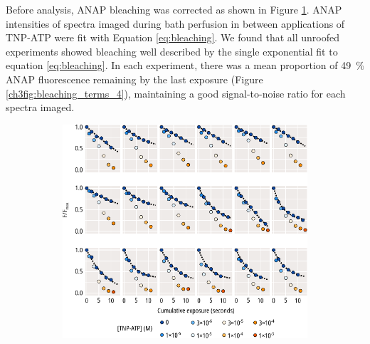 Before analysis, ANAP bleaching was corrected as shown in Figure \ref{ch3fig:bleaching_plots_2}.
ANAP intensities of spectra imaged during bath perfusion in between applications of TNP-ATP were fit with Equation \ref{eq:bleaching}.
We found that all unroofed experiments showed bleaching well described by the single exponential fit to equation \ref{eq:bleaching}.
In each experiment, there was a mean proportion of \SI{49}{\percent} ANAP fluorescence remaining by the last exposure (Figure \ref{ch3fig:bleaching_terms_4}), maintaining a good signal-to-noise ratio for each spectra imaged.

\begin{figure}[h]
	\centering
	\begin{subfigure}[t]{0.9\textwidth}
		\caption{}\label{ch3fig:bleaching_plots_2}
		\centering
		\includegraphics[width=\textwidth]{bleaching_plots_2.pdf}
	\end{subfigure}
	\vfill
	\begin{subfigure}[t]{0.45\textwidth}
		\caption{}\label{ch3fig:bleaching_terms_3}
		\centering

\end{subfigure}
\end{figure}
